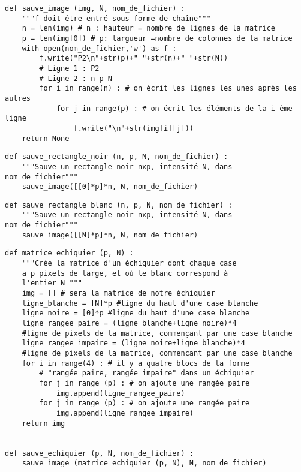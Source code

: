 \question{}

\begin{lstlisting}
def sauve_image (img, N, nom_de_fichier) :
    """f doit être entré sous forme de chaîne"""
    n = len(img) # n : hauteur = nombre de lignes de la matrice 
    p = len(img[0]) # p: largueur =nombre de colonnes de la matrice
    with open(nom_de_fichier,'w') as f :
        f.write("P2\n"+str(p)+" "+str(n)+" "+str(N))
        # Ligne 1 : P2
        # Ligne 2 : n p N
        for i in range(n) : # on écrit les lignes les unes après les autres
            for j in range(p) : # on écrit les éléments de la i ème ligne
                f.write("\n"+str(img[i][j]))
    return None
\end{lstlisting}

\question{}

\begin{lstlisting}
def sauve_rectangle_noir (n, p, N, nom_de_fichier) :
    """Sauve un rectangle noir nxp, intensité N, dans nom_de_fichier"""
    sauve_image([[0]*p]*n, N, nom_de_fichier)
\end{lstlisting}

\question{}

\begin{lstlisting}
def sauve_rectangle_blanc (n, p, N, nom_de_fichier) :
    """Sauve un rectangle noir nxp, intensité N, dans nom_de_fichier"""
    sauve_image([[N]*p]*n, N, nom_de_fichier)
\end{lstlisting}

\question{}

\begin{lstlisting}
def matrice_echiquier (p, N) :
    """Crée la matrice d'un échiquier dont chaque case
    a p pixels de large, et où le blanc correspond à
    l'entier N """
    img = [] # sera la matrice de notre échiquier
    ligne_blanche = [N]*p #ligne du haut d'une case blanche
    ligne_noire = [0]*p #ligne du haut d'une case blanche
    ligne_rangee_paire = (ligne_blanche+ligne_noire)*4
    #ligne de pixels de la matrice, commençant par une case blanche
    ligne_rangee_impaire = (ligne_noire+ligne_blanche)*4
    #ligne de pixels de la matrice, commençant par une case blanche
    for i in range(4) : # il y a quatre blocs de la forme
        # "rangée paire, rangée impaire" dans un échiquier
        for j in range (p) : # on ajoute une rangée paire
            img.append(ligne_rangee_paire)
        for j in range (p) : # on ajoute une rangée paire
            img.append(ligne_rangee_impaire)
    return img


def sauve_echiquier (p, N, nom_de_fichier) :
    sauve_image (matrice_echiquier (p, N), N, nom_de_fichier)
\end{lstlisting}

